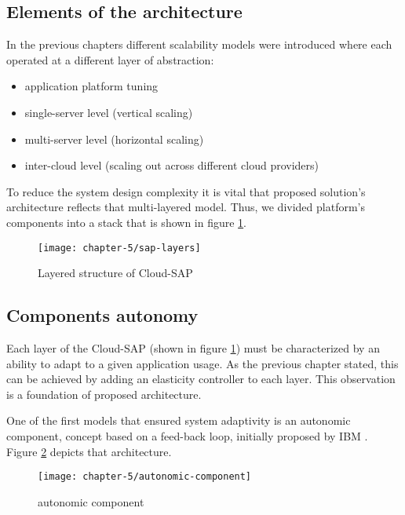\subsection{Elements of the architecture}
In the previous chapters different scalability models were introduced where each operated at a different layer of abstraction: 
\begin{itemize}
	\item application platform tuning
	\item single-server level (vertical scaling)
	\item multi-server level (horizontal scaling) 
	\item inter-cloud level (scaling out across different cloud providers)
\end{itemize}

To reduce the system design complexity it is vital that proposed solution's
architecture reflects that multi-layered model. Thus, we divided platform's components into a stack that is shown in figure \ref{design:csap-layers}.

\begin{figure}[!ht]
  \begin{center}
    \texttt{[image: chapter-5/sap-layers]}
  \end{center}
  \caption{Layered structure of Cloud-SAP}
  \label{design:csap-layers}
\end{figure}

\subsection{Components autonomy}
Each layer of the Cloud-SAP (shown in figure \ref{design:csap-layers}) must be characterized by an ability to adapt to a given application usage. As the previous chapter stated, this can be achieved by adding an elasticity controller to each layer. This observation is a foundation of proposed architecture.

One of the first models that ensured system adaptivity is an autonomic component, concept based on a feed-back loop, initially proposed by IBM \cite{IBM06}. Figure \ref{ch5:autonomic-component} depicts that architecture. 

\begin{figure}[!ht]
  \begin{center}
    \texttt{[image: chapter-5/autonomic-component]}
  \end{center}
  \caption{autonomic component}
  \label{ch5:autonomic-component}
\end{figure}


